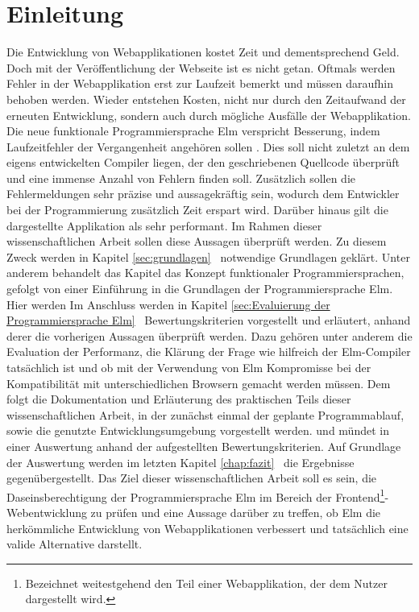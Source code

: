 \chapter{Einleitung}
\label{sec:einleitung}
Die Entwicklung von Webapplikationen kostet Zeit und dementsprechend Geld. Doch mit der Veröffentlichung der Webseite ist es nicht getan. Oftmals werden Fehler in der Webapplikation erst zur Laufzeit bemerkt und müssen daraufhin behoben werden. Wieder entstehen Kosten, nicht nur durch den Zeitaufwand der erneuten Entwicklung, sondern auch durch mögliche Ausfälle der Webapplikation. Die neue funktionale Programmiersprache Elm verspricht Besserung, indem Laufzeitfehler der Vergangenheit angehören sollen \cite[Vgl. f.]{elm-no-runtime-errors}. Dies soll nicht zuletzt an dem eigens entwickelten Compiler liegen, der den geschriebenen Quellcode überprüft und eine immense Anzahl von Fehlern finden soll. Zusätzlich sollen die Fehlermeldungen sehr präzise und aussagekräftig sein, wodurch dem Entwickler bei der Programmierung zusätzlich Zeit erspart wird. Darüber hinaus gilt die dargestellte Applikation als sehr performant.
Im Rahmen dieser wissenschaftlichen Arbeit sollen diese Aussagen überprüft werden. Zu diesem Zweck werden in Kapitel \ref{sec:grundlagen} \glqq{}\grqq~notwendige Grundlagen geklärt. Unter anderem behandelt das Kapitel das Konzept funktionaler Programmiersprachen, gefolgt von einer Einführung in die Grundlagen der Programmiersprache Elm. Hier werden  Im Anschluss werden in Kapitel \ref{sec:Evaluierung der Programmiersprache Elm} \glqq{}\grqq~Bewertungskriterien vorgestellt und erläutert, anhand derer die vorherigen Aussagen überprüft werden. Dazu gehören unter anderem die Evaluation der Performanz, die Klärung der Frage wie hilfreich der Elm-Compiler tatsächlich ist und ob mit der Verwendung von Elm Kompromisse bei der Kompatibilität mit unterschiedlichen Browsern gemacht werden müssen. Dem folgt die Dokumentation und Erläuterung des praktischen Teils dieser wissenschaftlichen Arbeit, in der zunächst einmal der geplante Programmablauf, sowie die genutzte Entwicklungsumgebung vorgestellt werden.  und mündet in einer Auswertung anhand der aufgestellten Bewertungskriterien. Auf Grundlage der Auswertung werden im letzten Kapitel \ref{chap:fazit} \glqq{}\grqq~die Ergebnisse gegenübergestellt. Das Ziel dieser wissenschaftlichen Arbeit soll es sein, die Daseinsberechtigung der Programmiersprache Elm im Bereich der Frontend\footnote{Bezeichnet weitestgehend den Teil einer Webapplikation, der dem Nutzer dargestellt wird.}-Webentwicklung zu prüfen und eine Aussage darüber zu treffen, ob Elm die herkömmliche Entwicklung von Webapplikationen verbessert und tatsächlich eine valide Alternative darstellt.

